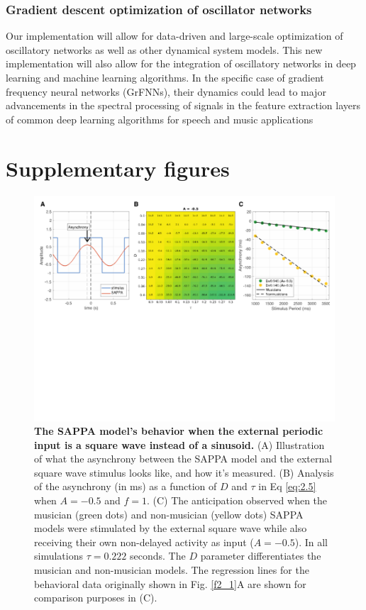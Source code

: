 \documentclass{report}
\begin{document}
\subsection{Gradient descent optimization of oscillator networks}
Our implementation will allow for data-driven and large-scale optimization of oscillatory networks as well as other dynamical system models. This new implementation will also allow for the integration of oscillatory networks in deep learning and machine learning algorithms. In the specific case of gradient frequency neural networks (GrFNNs), their dynamics could lead to major advancements in the spectral processing of signals in the feature extraction layers of common deep learning algorithms for speech and music applications


\appendix
\chapter{Supplementary figures}
\begin{figure}
    \centering
    \includegraphics[width=1.0\textwidth]{figures/figS_1.png}
    \caption[The SAPPA model's behavior when the external periodic input is a square wave instead of a sinusoid]{\textbf{The SAPPA model's behavior when the external periodic input is a square wave instead of a sinusoid.} (A) Illustration of what the asynchrony between the SAPPA model and the external square wave stimulus looks like, and how it's measured. (B) Analysis of the asynchrony (in ms) as a function of $D$ and $\tau$ in Eq \eqref{eq:2.5} when $A = -0.5$ and $f = 1$. (C) The anticipation observed when the musician (green dots) and non-musician (yellow dots) SAPPA models were stimulated by the external square wave while also receiving their own non-delayed activity as input ($A = -0.5$). In all simulations $\tau = 0.222$ seconds. The $D$ parameter differentiates the musician and non-musician models. The regression lines for the behavioral data originally shown in Fig.{} \ref{f2_1}A are shown for comparison purposes in (C).}
    \label{fS_1}
\end{figure}
\end{document}
